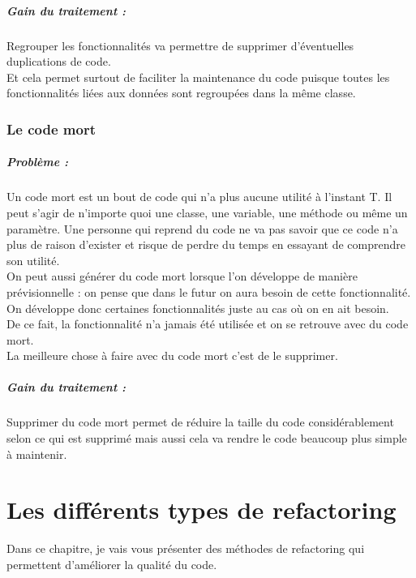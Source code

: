 \documentclass[a4paper,twoside,12pt,openright]{report}
\begin{document}
\paragraph{Gain du traitement :}
Regrouper les fonctionnalités va permettre de supprimer d'éventuelles  duplications de code.\\
Et cela permet surtout de faciliter la maintenance du code puisque toutes les fonctionnalités liées aux données sont regroupées dans la même classe.\\

\subsection{Le code mort}
\paragraph{Problème :}
Un code mort est un bout de code qui n'a plus aucune utilité à l'instant T. Il peut s'agir de n'importe quoi une classe, une variable, une méthode ou même un paramètre.
Une personne qui reprend du code ne va pas savoir que ce code n'a plus de raison d'exister et risque de perdre du temps en essayant de comprendre son utilité.\\

On peut aussi générer du code mort lorsque l'on développe de manière prévisionnelle : on pense que dans le futur on aura besoin de cette fonctionnalité.
On développe donc certaines fonctionnalités juste au cas où on en ait besoin.\\
De ce fait, la fonctionnalité n'a jamais été utilisée et on se retrouve avec du code mort.\\

La meilleure chose à faire avec du code mort c'est de le supprimer.\\

\paragraph{Gain du traitement :}
Supprimer du code mort permet de réduire la taille du code considérablement selon ce qui est supprimé mais aussi cela va rendre le code beaucoup plus simple à maintenir.\\




\chapter{Les différents types de refactoring}
Dans ce chapitre, je vais vous présenter des méthodes de refactoring qui permettent d'améliorer la qualité du code.\\
\end{document}
